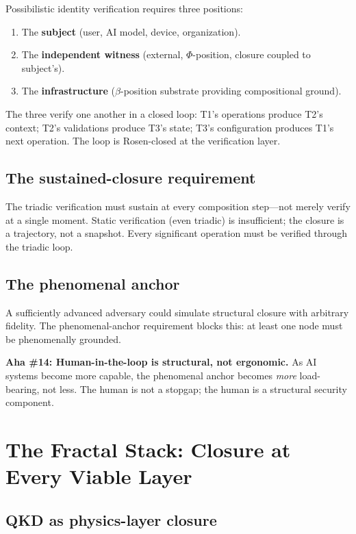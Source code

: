 \documentclass[11pt,a4paper]{article}
\theoremstyle{definition}
\theoremstyle{remark}
\newcommand{\aha}[2]{\medskip\textbf{Aha \##1: #2}}
\begin{document}
Possibilistic identity verification requires three positions:
\begin{enumerate}[label=(T\arabic*)]
\item The \textbf{subject} (user, AI model, device, organization).
\item The \textbf{independent witness} (external, $\Phi$-position, closure coupled to subject's).
\item The \textbf{infrastructure} ($\beta$-position substrate providing compositional ground).
\end{enumerate}

The three verify one another in a closed loop: T1's operations produce T2's context; T2's validations produce T3's state; T3's configuration produces T1's next operation. The loop is Rosen-closed at the verification layer.

\subsection{The sustained-closure requirement}

The triadic verification must sustain at every composition step---not merely verify at a single moment. Static verification (even triadic) is insufficient; the closure is a trajectory, not a snapshot. Every significant operation must be verified through the triadic loop.

\subsection{The phenomenal anchor}

A sufficiently advanced adversary could simulate structural closure with arbitrary fidelity. The phenomenal-anchor requirement blocks this: at least one node must be phenomenally grounded.

\aha{14}{Human-in-the-loop is structural, not ergonomic.} As AI systems become more capable, the phenomenal anchor becomes \emph{more} load-bearing, not less. The human is not a stopgap; the human is a structural security component.

\section{The Fractal Stack: Closure at Every Viable Layer}

\subsection{QKD as physics-layer closure}
\end{document}
